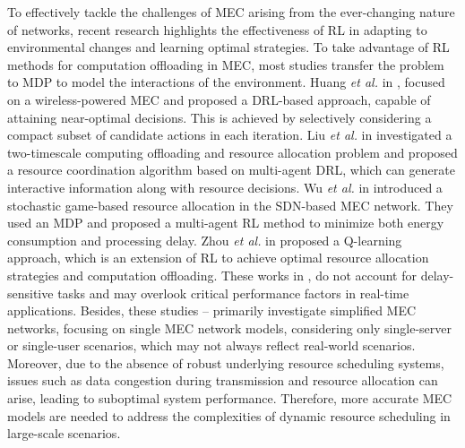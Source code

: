 \documentclass[10pt, journal,letterpaper]{IEEEtran}
\begin{document}
 
To effectively tackle the challenges of MEC arising from the ever-changing nature of networks, recent research highlights the effectiveness of RL in adapting to environmental changes and learning optimal strategies. To take advantage of RL methods for computation offloading in MEC, most studies transfer the problem to MDP to model the interactions of the environment.
Huang \textit{et al.} in \cite{huang2019deep}, focused on a wireless-powered MEC and proposed a DRL-based approach, capable of attaining near-optimal decisions. This is achieved by selectively considering a compact subset of candidate actions in each iteration. Liu \textit{et al.} in \cite{liu2021learn} investigated a two-timescale computing offloading and resource allocation problem and proposed a resource coordination algorithm based on multi-agent DRL, which can generate interactive information along with resource decisions. 
Wu \textit{et al.} in \cite{wu2023computation} introduced a stochastic game-based resource allocation in the SDN-based MEC network. They used an MDP and proposed a multi-agent RL method to minimize both energy consumption and processing delay. Zhou \textit{et al.} in \cite{zhou2021deep} proposed a Q-learning approach, which is an extension of RL to achieve optimal resource allocation strategies and computation offloading. 
These works in \cite{huang2019deep}, \cite{liu2021learn} do not account for delay-sensitive tasks and may overlook critical performance factors in real-time applications. Besides, these studies \cite{huang2019deep}--\cite{zhou2021deep} primarily investigate simplified MEC networks, focusing on single MEC network models, considering only single-server or single-user scenarios, which may not always reflect real-world scenarios. 
Moreover, due to the absence of robust underlying resource scheduling systems, issues such as data congestion during transmission and resource allocation can arise, leading to suboptimal system performance. Therefore, more accurate MEC models are needed to address the complexities of dynamic resource scheduling in large-scale scenarios.
\end{document}
